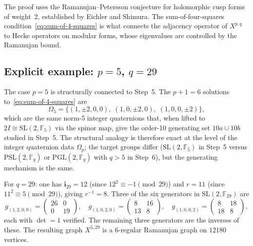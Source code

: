     The proof uses the Ramanujan--Petersson conjecture for holomorphic cusp
    forms of weight~2, established by Eichler and Shimura.
    The sum-of-four-squares condition~\eqref{eq:sum-of-4-squares} is what
    connects the adjacency operator of $X^{p,q}$ to Hecke operators on
    modular forms, whose eigenvalues are controlled by the Ramanujan bound.

  \subsection{Explicit example: $p = 5$, $q = 29$}
    \label{sec:step6a-p5q29}

    The case $p = 5$ is structurally connected to Step~5.
    The $p+1 = 6$ solutions to~\eqref{eq:sum-of-4-squares} are
    \begin{equation}
      \Omega_5 = \bigl\{
      (1, \pm 2, 0, 0),\;
      (1, 0, \pm 2, 0),\;
      (1, 0, 0, \pm 2)
      \bigr\},
      \label{eq:omega5}
    \end{equation}
    which are the same norm-5 integer quaternions that, when lifted to
    $2I \cong \mathrm{SL}(2,\mathbb{F}_5)$ via the spinor map, give the
    order-10 generating set $10a \cup 10b$ studied in Step~5.
    The structural analogy is therefore exact at the level of the integer
    quaternion data $\Omega_p$; the target groups differ ($\mathrm{SL}(2,
\mathbb{F}_5)$ in Step~5 versus $\mathrm{PSL}(2,\mathbb{F}_q)$ or
    $\mathrm{PGL}(2,\mathbb{F}_q)$ with $q > 5$ in Step~6), but the
    generating mechanism is the same.

    For $q = 29$: one has $\mathbf{i}_{29} = 12$ (since $12^2 \equiv -1
\pmod{29}$) and $r = 11$ (since $11^2 \equiv 5 \pmod{29}$), giving
    $r^{-1} = 8$.
    Three of the six generators in $\mathrm{SL}(2,\mathbb{F}_{29})$ are
    \begin{equation}
      g_{(1,2,0,0)} =
      \begin{pmatrix} 26 & 0 \\ 0 & 19 \end{pmatrix}, \quad
      g_{(1,0,2,0)} =
      \begin{pmatrix} 8 & 16 \\ 13 & 8 \end{pmatrix}, \quad
      g_{(1,0,0,2)} =
      \begin{pmatrix} 8 & 18 \\ 18 & 8 \end{pmatrix},
      \label{eq:generators-p5q29}
    \end{equation}
    each with $\det = 1$ verified.
    The remaining three generators are the inverses of these.
    The resulting graph $X^{5,29}$ is a 6-regular Ramanujan graph on
    $12180$ vertices.

